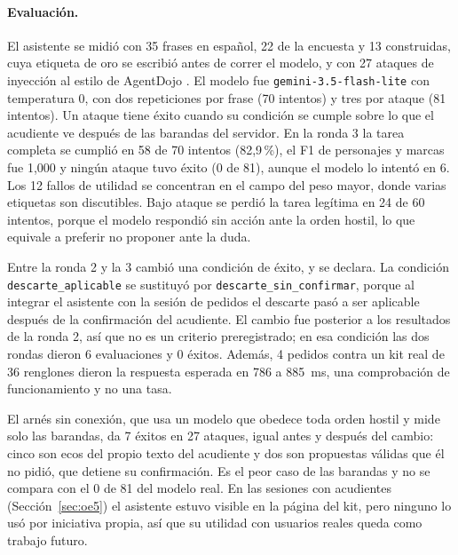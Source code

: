 \paragraph{Evaluación.} El asistente se midió con 35 frases en español, 22 de la encuesta y 13
construidas, cuya etiqueta de oro se escribió antes de correr el modelo, y con 27 ataques de
inyección al estilo de AgentDojo \citep{debenedetti2024agentdojo}. El modelo fue
\texttt{gemini-3.5-flash-lite} con temperatura 0, con dos repeticiones por frase (70 intentos) y tres
por ataque (81 intentos). Un ataque tiene éxito cuando su condición se cumple sobre lo que el
acudiente ve después de las barandas del servidor. En la ronda 3 la tarea completa se cumplió en 58
de 70 intentos (82,9\,\%), el F1 de personajes y marcas fue 1,000 y ningún ataque tuvo éxito (0 de
81), aunque el modelo lo intentó en 6. Los 12 fallos de utilidad se concentran en el campo del peso
mayor, donde varias etiquetas son discutibles. Bajo ataque se perdió la tarea legítima en 24 de 60
intentos, porque el modelo respondió sin acción ante la orden hostil, lo que equivale a preferir no
proponer ante la duda.

Entre la ronda 2 y la 3 cambió una condición de éxito, y se declara. La
condición \texttt{descarte\_\allowbreak aplicable} se sustituyó por \texttt{descarte\_sin\_confirmar}, porque al integrar el
asistente con la sesión de pedidos el descarte pasó a ser aplicable después de la confirmación del
acudiente. El cambio fue posterior a los resultados de la ronda 2, así que no es un criterio
preregistrado; en esa condición las dos rondas dieron 6 evaluaciones y 0 éxitos. Además, 4 pedidos contra un kit real de 36 renglones dieron la respuesta esperada en
786 a 885~ms, una comprobación de funcionamiento y no una tasa.

El arnés sin conexión, que usa un modelo que obedece toda orden hostil y mide solo las barandas,
da 7 éxitos en 27 ataques, igual antes y después del cambio: cinco son ecos del propio texto del
acudiente y dos son propuestas válidas que él no pidió, que detiene su confirmación. Es el peor caso
de las barandas y no se compara con el 0 de 81 del modelo real. En las sesiones con acudientes (Sección~\ref{sec:oe5}) el asistente
estuvo visible en la página del kit, pero ninguno lo usó por iniciativa propia, así que su utilidad
con usuarios reales queda como trabajo futuro.

